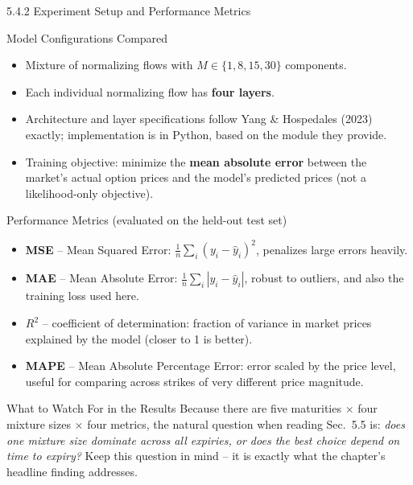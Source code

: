 \documentclass[aspectratio=169,10pt]{beamer}
\begin{document}
\begin{frame}[allowframebreaks]{5.4.2 Experiment Setup and Performance Metrics}

\begin{block}{Model Configurations Compared}
\begin{itemize}
  \item Mixture of normalizing flows with $M \in \{1, 8, 15, 30\}$
  components.
  \item Each individual normalizing flow has \textbf{four layers}.
  \item Architecture and layer specifications follow Yang \& Hospedales
  (2023) exactly; implementation is in Python, based on the module they
  provide.
  \item Training objective: minimize the \textbf{mean absolute error}
  between the market's actual option prices and the model's predicted
  prices (not a likelihood-only objective).
\end{itemize}
\end{block}

\begin{block}{Performance Metrics (evaluated on the held-out test set)}
\begin{itemize}
  \item \textbf{MSE} -- Mean Squared Error: $\frac{1}{n}\sum_i (y_i - \hat y_i)^2$,
  penalizes large errors heavily.
  \item \textbf{MAE} -- Mean Absolute Error: $\frac{1}{n}\sum_i |y_i - \hat y_i|$,
  robust to outliers, and also the training loss used here.
  \item \textbf{$R^2$} -- coefficient of determination: fraction of variance
  in market prices explained by the model (closer to 1 is better).
  \item \textbf{MAPE} -- Mean Absolute Percentage Error: error scaled by the
  price level, useful for comparing across strikes of very different
  price magnitude.
\end{itemize}
\end{block}

\framebreak

\begin{block}{What to Watch For in the Results}
Because there are five maturities $\times$ four mixture sizes $\times$ four
metrics, the natural question when reading Sec.~5.5 is: \emph{does one
mixture size dominate across all expiries, or does the best choice depend on
time to expiry?} Keep this question in mind -- it is exactly what the
chapter's headline finding addresses.
\end{block}

\end{frame}
\end{document}

